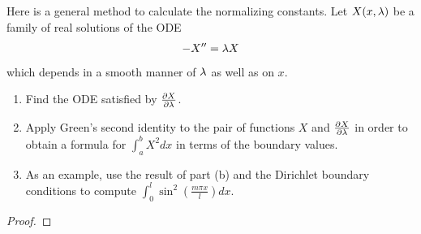 \documentclass{report}
\begin{document}
\begin{question}{}{}
Here is a general method to calculate the normalizing constants. Let $X(x,\lambda )$ be a family of real solutions of the ODE 
\begin{align*}
-X''=\lambda  X
\end{align*}
which depends in a smooth manner of $\lambda $ as well as on $x$. 
 \begin{enumerate}[label=(\alph*)]
  \item Find the ODE satisfied by  $\frac{\partial X}{\partial \lambda }$.
  \item Apply Green's second identity to the pair of functions $X$ and  $\frac{\partial X}{\partial \lambda }$ in order to obtain a formula for $\int _a^b X^2 dx$ in terms of the boundary values. 
  \item As an example, use the result of part (b) and the Dirichlet boundary conditions to compute  $\int _0^l \sin^2 (\frac{m \pi  x}{l})dx$. 
\end{enumerate}
\end{question}
\begin{proof}

\end{proof}
\end{document}

